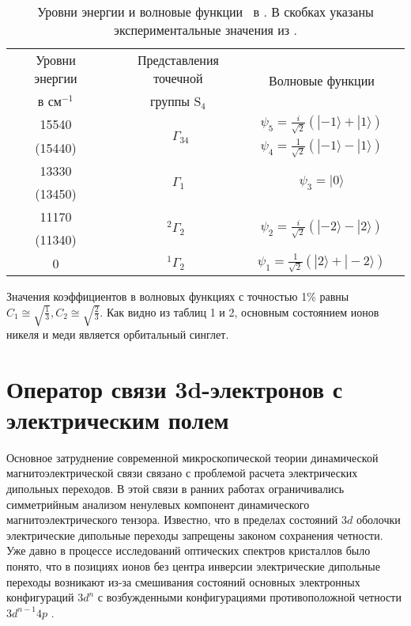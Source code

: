 \begin{table} [htbp]%
	\centering
	\begin{threeparttable}%
		\caption{Уровни энергии и волновые функции \cu\ в \cbo. В скобках указаны экспериментальные значения из \cite{Pisarev2011}.}%
		\label{tab:CuEnAndWf}%
		\begin{SingleSpace}
			\begin{tabular}{| c | c | c | c |}
				\hline 
				Уровни энергии & Представления точечной & \multirow{2}{*}{Волновые функции} \\ 
				в см$^{-1}$ & группы $\mathrm{S}_{4}$ &  \\ 
				\hline 
				15540 & \multirow{2}{*}{$\phantom{{ }^{2} }\Gamma_{34}$} & $\psi_{5}=\frac{i}{\sqrt{2}}(|-1\rangle+|1\rangle)$ \\
				(15440) & & $\psi_{4}=\frac{1}{\sqrt{2}}(|-1\rangle-|1\rangle)$ \\
				\hline
				13330 & \multirow{2}{*}{$\phantom{{ }^{2} }\Gamma_{1\phantom{4}}$} & \multirow{2}{*}{$\psi_{3}=|0\rangle$} \\
				(13450) & & \\
				\hline
				11170 & \multirow{2}{*}{${ }^{2} \Gamma_{2\phantom{4}}$} & \multirow{2}{*}{$\psi_{2}=\frac{i}{\sqrt{2}}(|-2\rangle-|2\rangle)$} \\
				(11340) & & \\
				\hline
				0 & ${ }^{1} \Gamma_{2\phantom{4}}$ & $\psi_{1}=\frac{1}{\sqrt{2}}(|2\rangle+|-2\rangle)$ \\
				\hline
			\end{tabular}%
		\end{SingleSpace}
	\end{threeparttable}
\end{table}

Значения коэффициентов в волновых функциях с точностью 1\% равны $C_{1}\cong\sqrt{\frac{1}{3}}, C_{2}\cong\sqrt{\frac{2}{3}}$. Как видно из таблиц 1 и 2, основным состоянием ионов никеля и меди является орбитальный синглет.

\section{Оператор связи 3d-электронов с электрическим полем}\label{sec:ch2/sec2}

Основное затруднение современной микроскопической теории динамической магнитоэлектрической связи связано с проблемой расчета электрических дипольных переходов. В этой связи в ранних работах \cite{Lovesey2009, Miyahara2012, Miyahara2014, Kezsmarki2014} ограничивались симметрийным анализом ненулевых компонент динамического магнитоэлектрического тензора. Известно, что в пределах состояний $3d$ оболочки электрические дипольные переходы запрещены законом сохранения четности. Уже давно в процессе исследований оптических спектров кристаллов было понято, что в позициях ионов без центра инверсии электрические дипольные переходы возникают из-за смешивания состояний основных электронных конфигураций $3d^n$ с возбужденными конфигурациями противоположной четности $3d^{n-1}4p$ \cite{Low1960}.

